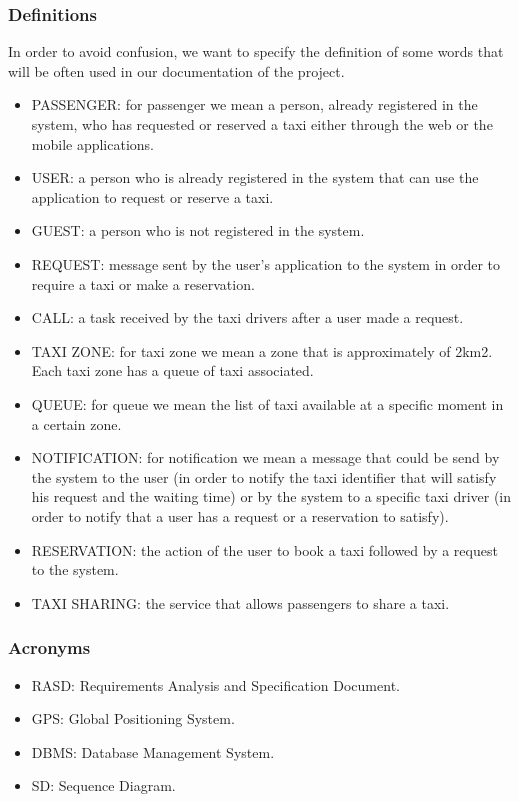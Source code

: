 \subsubsection{Definitions}
	In order to avoid confusion, we want to specify the definition of some words that will be often used in our documentation of the project. 
	\begin{itemize}
		\item PASSENGER: for passenger we mean a person, already registered in the system, who has requested or reserved a taxi either through the web or the mobile applications.
		\item USER: a person who is already registered in the system that can use the application to request or reserve a taxi.
		\item GUEST:  a person who is not registered in the system.
		\item REQUEST: message sent by the user's application to the system in order to require a taxi or make a reservation.
		\item CALL: a task received by the taxi drivers after a user made a request.
		\item TAXI ZONE: for taxi zone we mean a zone that is approximately of 2km2. Each taxi zone has a queue of taxi associated. 
		\item QUEUE: for queue we mean the list of taxi available at a specific moment in a certain zone.
		\item NOTIFICATION: for notification we mean a message that could be send by the system to the user (in order to notify the taxi identifier that will satisfy his request and the waiting time) or by the system to a specific taxi driver (in order to notify that a user has a request or a reservation to satisfy).
		\item RESERVATION: the action of the user to book a taxi followed by a request to the system.
		\item TAXI SHARING: the service that allows passengers to share a taxi.
	\end{itemize}

\subsubsection{Acronyms}
	\begin{itemize}
	    \item RASD: Requirements Analysis and Specification Document.
		\item GPS: Global Positioning System.
		\item DBMS: Database Management System.
		\item SD: Sequence Diagram.
	\end{itemize}